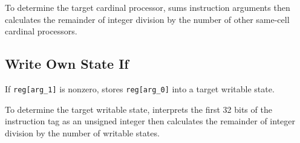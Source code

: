 To determine the target cardinal processor, sums instruction arguments then calculates the remainder of integer division by the number of other same-cell cardinal processors.

\subsection{Write Own State If}


If \texttt{reg[arg\_1]} is nonzero, stores \texttt{reg[arg\_0]} into a target writable state.

To determine the target writable state, interprets the first 32 bits of the instruction tag as an unsigned integer then calculates the remainder of integer division by the number of writable states.
